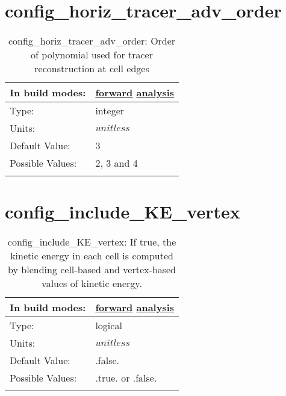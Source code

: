 \section[config\_horiz\_tracer\_adv\_order]{config\_horiz\_tracer\_adv\_order}
\label{sec:nm_sec_config_horiz_tracer_adv_order}
\begin{center}
\begin{longtable}{| p{2.0in} || p{4.0in} |}
    \hline
    In build modes: & \hyperref[subsec:forward_nm_tab_advection]{forward} \hyperref[subsec:analysis_nm_tab_advection]{analysis} \\
    \hline
    Type: & integer \\
    \hline
    Units: & $unitless$ \\
    \hline
    Default Value: & 3 \\
    \hline
    Possible Values: & 2, 3 and 4 \\
    \hline
    \caption{config\_horiz\_tracer\_adv\_order: Order of polynomial used for tracer reconstruction at cell edges}
\end{longtable}
\end{center}
\section[config\_include\_KE\_vertex]{config\_include\_KE\_vertex}
\label{sec:nm_sec_config_include_KE_vertex}
\begin{center}
\begin{longtable}{| p{2.0in} || p{4.0in} |}
    \hline
    In build modes: & \hyperref[subsec:forward_nm_tab_debug]{forward} \hyperref[subsec:analysis_nm_tab_debug]{analysis} \\
    \hline
    Type: & logical \\
    \hline
    Units: & $unitless$ \\
    \hline
    Default Value: & .false. \\
    \hline
    Possible Values: & .true. or .false. \\
    \hline
    \caption{config\_include\_KE\_vertex: If true, the kinetic energy in each cell is computed by blending cell-based and vertex-based values of kinetic energy.}
\end{longtable}
\end{center}
